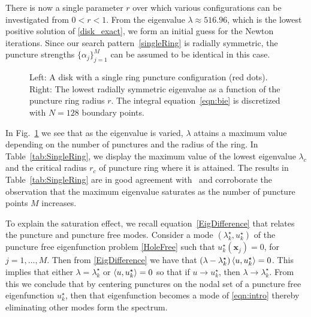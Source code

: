 \documentclass[times]{article}
\newcommand{\xx}{\mathbf{x}}
\begin{document}
There is now a single parameter $r$ over which various configurations
can be investigated from $0<r<1$. From the eigenvalue $\lambda\approx
516.96$, which is the lowest positive solution of \eqref{disk_exact}, we
form an initial guess for the Newton iterations. Since our search
pattern~\eqref{singleRing} is radially symmetric, the puncture strengths
$\{\alpha_j\}_{j=1}^M$ can be assumed to be identical in this case. 
%
\begin{figure}[htbp]
\centering
{\label{fig:SingleRing_A}}
\hspace{0.25in} {\label{fig:SingleRing_B}}
\parbox{0.75\textwidth}{ \caption{Left: A disk with a single ring
puncture configuration (red dots). Right: The lowest radially symmetric
eigenvalue as a function of the puncture ring radius $r$.  The integral
equation~\eqref{eqn:bie} is discretized with $N=128$ boundary points.
\label{fig:SingleRing}} }
\end{figure}

In Fig.~\ref{fig:SingleRing} we see that as the eigenvalue is varied,
$\lambda$ attains a maximum value depending on the number of punctures
and the radius of the ring. In Table~\ref{tab:SingleRing}, we display
the maximum value of the lowest eigenvalue $\lambda_c$ and the critical
radius $r_c$ of puncture ring where it is attained. The results in
Table~\ref{tab:SingleRing} are in good agreement with~\cite{LHS} and
corroborate the observation that the maximum eigenvalue saturates as the
number of puncture points $M$ increases.

To explain the saturation effect, we recall
equation~\eqref{EigDifference} that relates the puncture and puncture
free modes. Consider a mode $(\lambda_k^{\star},u_k^{\star})$ of the
puncture free eigenfunction problem \eqref{HoleFree} such that
$u_k^{\star}(\xx_j) = 0$, for $j = 1,\ldots,M$. Then from
\eqref{EigDifference} we have that $(\lambda - \lambda_k^{\star})
\braket{u,u_k^{\star}} = 0$.
%
This implies that either $\lambda = \lambda_k^{\star}$ or
$\braket{u,u_k^{\star}} = 0$ so that if $u\to u^{\star}_k$, then
$\lambda \to \lambda_k^{\star}$. From this we conclude that by centering
punctures on the nodal set of a puncture free eigenfunction
$u_k^{\star}$, then that eigenfunction becomes a mode of
\eqref{eqn:intro} thereby eliminating other modes form the spectrum.
\end{document}
